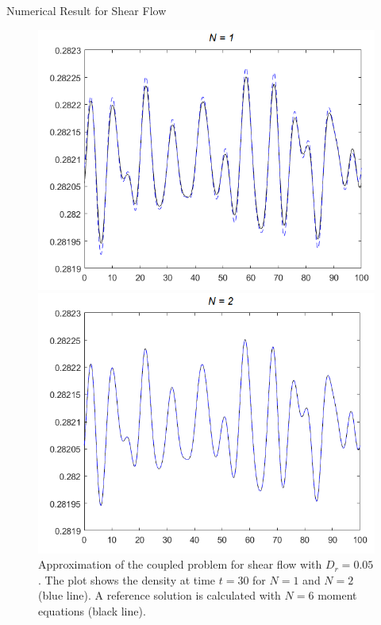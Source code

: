 \begin{frame}{Numerical Result for Shear Flow}
		\begin{figure}
			\centering
			\begin{minipage}{0.46\textwidth}
				\includegraphics[width=\textwidth]{Bilder_wx/ClusterFormation/N=1vsN=6_Dr=0.05_mx=8192}
			\end{minipage}
			\hfill
			\begin{minipage}{0.46\textwidth}
				\includegraphics[width=\textwidth]{Bilder_wx/ClusterFormation/N=2vsN=6_Dr=0.05_mx=8192}
			\end{minipage}
			\caption{Approximation of the coupled problem for shear flow with $D_r =0.05$. The plot shows the density at time $t=30$ for $N = 1$ and $N = 2$ (blue line). A reference solution is calculated with $N = 6$ moment equations (black line).}
			\label{ClusterFormation}
		\end{figure}
\end{frame}


